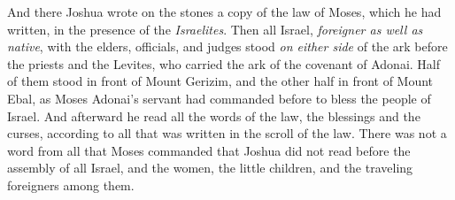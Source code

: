 \begin{biblechapter}
\verse And there Joshua wrote on the stones a copy of the law of Moses, which he had written, in the presence of the \textit{Israelites}.
\verse Then all Israel, \textit{foreigner as well as native}, with the elders, officials, and judges stood \textit{on either side} of the ark before the priests and the Levites, who carried the ark of the covenant of Adonai. Half of them stood in front of Mount Gerizim, and the other half in front of Mount Ebal, as Moses Adonai’s servant had commanded before to bless the people of Israel.
\verse And afterward he read all the words of the law, the blessings and the curses, according to all that was written in the scroll of the law.
\verse There was not a word from all that Moses commanded that Joshua did not read before the assembly of all Israel, and the women, the little children, and the traveling foreigners among them.
\end{biblechapter}

